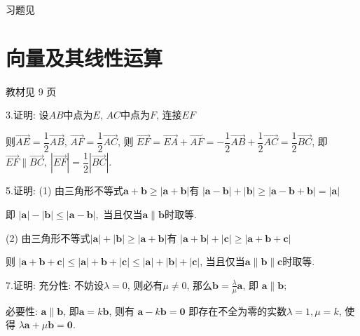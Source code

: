 \begin{flushright}
  \color{zhanqing!80}
   习题见
\end{flushright}
\section{向量及其线性运算}
\begin{flushright}
  \color{zhanqing!80}
  \color{zhanqing!80}
   教材见 9 页
\end{flushright}

  3.证明: 设$AB$中点为$E$, $AC$中点为$F$, 连接$EF$

  则$\overrightarrow{AE} = \dfrac{1}{2} \overrightarrow{AB}$, $\overrightarrow{AF} = \dfrac{1}{2} \overrightarrow{AC}$, 则
  $\overrightarrow{EF} = \overrightarrow{EA} + \overrightarrow{AF} = - \dfrac{1}{2} \overrightarrow{AB} + \dfrac{1}{2} \overrightarrow{AC} = \dfrac{1}{2} \overrightarrow {BC}$,
  即
  $\overrightarrow {EF} \parallel \overrightarrow {BC},~\left| {\overrightarrow {EF} } \right| = \dfrac{1}{2}\left| {\overrightarrow {BC} } \right|. $

  5.证明: (1) 由三角形不等式$\bm{a} + \bm{b} \ge \left| \bm{a} + \bm{b} \right|$有
  $\left| \bm{a} - \bm{b} \right| + \left| \bm{b} \right| \ge \left| \bm{a} - \bm{b}  +  \bm{b} \right| = \left| {\bm{a} } \right|$

  即
  $\left| {\bm{a} } \right| - \left| {\bm{b} } \right| \le \left| {\bm{a} } - {\bm{b} } \right|, $
  当且仅当$\bm {a} \parallel \bm {b}$时取等.

  (2) 由三角形不等式$\left| {\bm{a} } \right| + \left| {\bm{b} } \right| \ge \left| {\bm{a} } + \bm{b} \right|$有
  $\left| {\bm{a} } + {\bm{b} } \right| + \left| {\bm{c} } \right| \ge \left| {\bm{a} } + \bm{b}  + {\bm{c} } \right|$

  则
  $\left| {\bm{a} } + \bm{b}  + {\bm{c} } \right| \le \left| {\bm{a} } \right| + {\bm{b} } + \left| {\bm{c} } \right| \le |\bm{a}| + |\bm{b}| + |\bm{c}|$,
  当且仅当$\bm{a} \parallel \bm{b} \parallel \bm{c}$时取等.

  7.证明:  充分性: 不妨设$\lambda=0$, 则必有$\mu \ne 0$,
  那么$\bm{b}=\frac{\lambda}{\mu} \bm{a}$, 即
  $\bm{a} \parallel\bm{b}; $

   必要性: $\bm{a} \parallel \bm{b}$, 即$\bm{a} = k\bm{b}$,
  则有
  $\bm{a} - k\bm{b} = \bm{0}$
  即存在不全为零的实数$\lambda=1, \mu=k$, 使得
  $\lambda\bm{a} + \mu\bm{b} = \bm{0}.$

